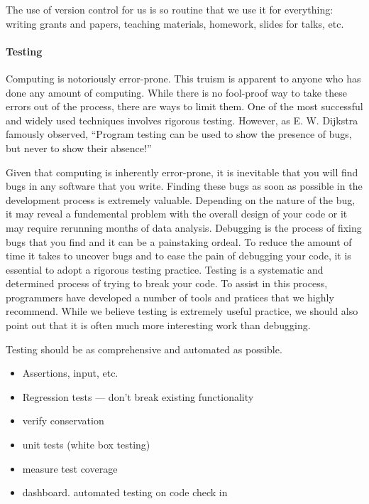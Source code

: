 \documentclass[ChapterTOCs,krantz2]{krantz} %
\begin{document}
The use of version control for us is so routine that we use it for everything:
writing grants and papers, teaching materials, homework, slides for talks, etc.

\paragraph{ {\bf Testing}} Computing is notoriously error-prone. This truism is
apparent to anyone who has done any amount of computing. While there is no
fool-proof way to take these errors out of the process, there are ways to limit
them. One of the most successful and widely used techniques involves rigorous
testing.  However, as E. W. Dijkstra famously observed, ``Program testing can
be used to show the presence of bugs, but never to show their absence!''
\cite{dahl1972structured}

Given that computing is inherently error-prone, it is inevitable that you
will find bugs in any software that you write. Finding these bugs as soon
as possible in the development process is extremely valuable. Depending on
the nature of the bug, it may reveal a fundemental problem with the overall
design of your code or it may require rerunning months of data analysis. Debugging
is the process of fixing bugs that you find and it can be a painstaking
ordeal. To reduce the amount of time it takes to uncover bugs and to ease the
pain of debugging your code, it is essential to adopt a rigorous testing practice.
Testing is a systematic and determined process of trying to break your code.
To assist in this process, programmers have developed a number of tools and pratices
that we highly recommend. While we believe testing is extremely useful practice, we
should also point out that it is often much more interesting work than debugging.

Testing should be as comprehensive and automated as possible.

\begin{itemize}
\item Assertions, input, etc.
\item Regression tests --- don't break existing functionality
\item verify conservation
\item unit tests (white box testing)
\item measure test coverage
\item dashboard. automated testing on code check in
\end{itemize}
\end{document}
